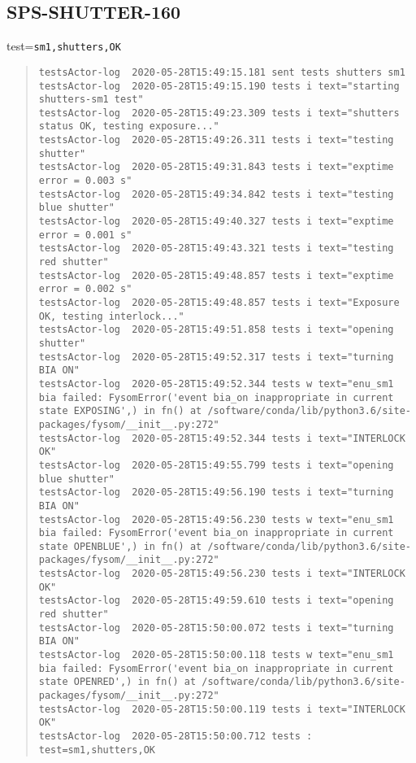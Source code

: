 \subsection{SPS-SHUTTER-160}
\label{sec:tc-160}

test=\texttt{sm1,shutters,OK}

\begin{quote}
\begin{tiny}
\begin{verbatim}
testsActor-log  2020-05-28T15:49:15.181 sent tests shutters sm1
testsActor-log  2020-05-28T15:49:15.190 tests i text="starting shutters-sm1 test"
testsActor-log  2020-05-28T15:49:23.309 tests i text="shutters status OK, testing exposure..."
testsActor-log  2020-05-28T15:49:26.311 tests i text="testing  shutter"
testsActor-log  2020-05-28T15:49:31.843 tests i text="exptime error = 0.003 s"
testsActor-log  2020-05-28T15:49:34.842 tests i text="testing blue shutter"
testsActor-log  2020-05-28T15:49:40.327 tests i text="exptime error = 0.001 s"
testsActor-log  2020-05-28T15:49:43.321 tests i text="testing red shutter"
testsActor-log  2020-05-28T15:49:48.857 tests i text="exptime error = 0.002 s"
testsActor-log  2020-05-28T15:49:48.857 tests i text="Exposure OK, testing interlock..."
testsActor-log  2020-05-28T15:49:51.858 tests i text="opening  shutter"
testsActor-log  2020-05-28T15:49:52.317 tests i text="turning BIA ON"
testsActor-log  2020-05-28T15:49:52.344 tests w text="enu_sm1 bia failed: FysomError('event bia_on inappropriate in current state EXPOSING',) in fn() at /software/conda/lib/python3.6/site-packages/fysom/__init__.py:272"
testsActor-log  2020-05-28T15:49:52.344 tests i text="INTERLOCK OK"
testsActor-log  2020-05-28T15:49:55.799 tests i text="opening blue shutter"
testsActor-log  2020-05-28T15:49:56.190 tests i text="turning BIA ON"
testsActor-log  2020-05-28T15:49:56.230 tests w text="enu_sm1 bia failed: FysomError('event bia_on inappropriate in current state OPENBLUE',) in fn() at /software/conda/lib/python3.6/site-packages/fysom/__init__.py:272"
testsActor-log  2020-05-28T15:49:56.230 tests i text="INTERLOCK OK"
testsActor-log  2020-05-28T15:49:59.610 tests i text="opening red shutter"
testsActor-log  2020-05-28T15:50:00.072 tests i text="turning BIA ON"
testsActor-log  2020-05-28T15:50:00.118 tests w text="enu_sm1 bia failed: FysomError('event bia_on inappropriate in current state OPENRED',) in fn() at /software/conda/lib/python3.6/site-packages/fysom/__init__.py:272"
testsActor-log  2020-05-28T15:50:00.119 tests i text="INTERLOCK OK"
testsActor-log  2020-05-28T15:50:00.712 tests : test=sm1,shutters,OK
\end{verbatim}
\end{tiny}
\end{quote}


